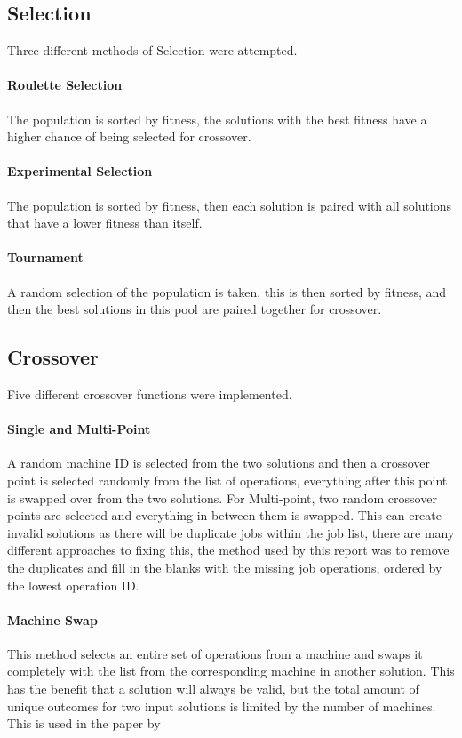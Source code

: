 \documentclass[14pt]{acmsiggraph}
\begin{document}
\subsection{Selection}
Three different methods of Selection were attempted.

\paragraph{Roulette Selection}
The population is sorted by fitness, the solutions with the best fitness have a higher chance of being selected for crossover.

\paragraph{Experimental Selection}
The population is sorted by fitness, then each solution is paired with all solutions that have a lower fitness than itself.

\paragraph{Tournament}
A random selection of the population is taken, this is then sorted by fitness, and then the best solutions in this pool are paired together for crossover.

\subsection{Crossover}
Five different crossover functions were implemented.
\paragraph{Single and Multi-Point}
A random machine ID is selected from the two solutions and then a crossover point is selected randomly from the list of operations, everything after this point is swapped over from the two solutions. For Multi-point, two random crossover points are selected and everything in-between them is swapped. This can create invalid solutions as there will be duplicate jobs within the job list, there are many different approaches to fixing this, the method used by this report was to remove the duplicates and fill in the blanks with the missing job operations, ordered by the lowest operation ID.

\paragraph{Machine Swap}
This method selects an entire set of operations from a machine and swaps it completely with the list from the corresponding machine in another solution. This has the benefit that a solution will always be valid, but the total amount of unique outcomes  for two input solutions is limited by the number of machines. This is used in the paper by \cite{wang2012new}
\end{document}
